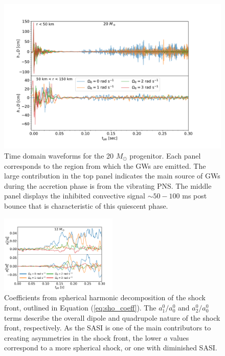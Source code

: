 \documentclass[twocolumn,times]{aastex62}  %
\begin{document}
 \begin{figure}[htp]
  \centering     %
  \includegraphics[width=\textwidth]{figures/tdwf_region_20.pdf}
  \caption{Time domain waveforms for the 20 $M_\odot$ progenitor.  Each panel corresponds to the region from which the GWs are emitted.  The large contribution in the top panel indicates the main source of GWs during the accretion phase is from the vibrating PNS.  The middle panel displays the inhibited convective signal $\sim 50-100 $ ms post bounce that is characteristic of this quiescent phase.}
  \label{fig:region}
\end{figure}

\begin{figure}
    \centering
    \includegraphics[width=0.5\textwidth]{figures/sasi_axis_norm.pdf}
    \caption{Coefficients from spherical harmonic decomposition of the shock front, outlined in Equation (\ref{eq:sho_coeff}).  The $a_1^0/a_0^0$ and $a_2^0/a_0^0$ terms describe the overall dipole and quadrupole nature of the shock front, respectively.  As the SASI is one of the main contributors to creating asymmetries in the shock front, the lower $a$ values correspond to a more spherical shock, or one with diminished SASI.}
    \label{fig:sasi}
\end{figure}
\end{document}

